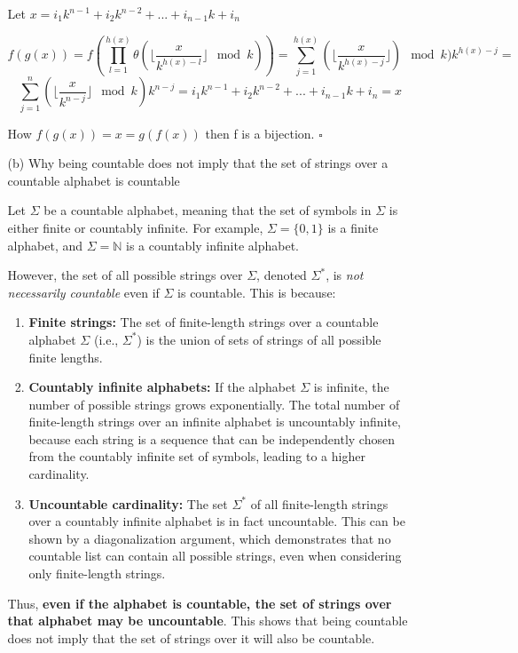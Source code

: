 \documentclass[9pt,tikz,border=2mm]{article}
\begin{document}
\begin{enumerate}
\begin{enumerate}
                Let $x = i_1k^{n-1} + i_2k^{n-2} + ... + i_{n-1}k + i_n$
          
                \[
                    f(g(x)) = f(\prod_{l=1}^{h(x)}\theta(\lfloor{\frac{x}{k^{h(x)-l}}}\rfloor \mod k)) = \sum_{j=1}^{h(x)}(\lfloor{\frac{x}{k^{h(x)-j}}}\rfloor) \mod k) k^{h(x)-j} =
                \]
                \[
                    \sum_{j=1}^{n}(\lfloor{\frac{x}{k^{n-j}}}\rfloor \mod k) k^{n-j}  = i_1k^{n-1} + i_2k^{n-2} + ... + i_{n-1}k + i_n = x
                \]

                How $f(g(x))=x=g(f(x))$ then f is a bijection.
                $\square$
              
                \item[(b)]Why being countable does not imply that the set of strings over a countable alphabet is countable

Let \( \Sigma \) be a countable alphabet, meaning that the set of symbols in \( \Sigma \) is either finite or countably infinite. For example, \( \Sigma = \{0, 1\} \) is a finite alphabet, and \( \Sigma = \mathbb{N} \) is a countably infinite alphabet.

However, the set of all possible strings over \( \Sigma \), denoted \( \Sigma^* \), is \textit{not necessarily countable} even if \( \Sigma \) is countable. This is because:

\begin{enumerate}
    \item \textbf{Finite strings:} The set of finite-length strings over a countable alphabet \( \Sigma \) (i.e., \( \Sigma^* \)) is the union of sets of strings of all possible finite lengths.
    \item \textbf{Countably infinite alphabets:} If the alphabet \( \Sigma \) is infinite, the number of possible strings grows exponentially. The total number of finite-length strings over an infinite alphabet is uncountably infinite, because each string is a sequence that can be independently chosen from the countably infinite set of symbols, leading to a higher cardinality.
    \item \textbf{Uncountable cardinality:} The set \( \Sigma^* \) of all finite-length strings over a countably infinite alphabet is in fact uncountable. This can be shown by a diagonalization argument, which demonstrates that no countable list can contain all possible strings, even when considering only finite-length strings.
\end{enumerate}

Thus, \textbf{even if the alphabet is countable, the set of strings over that alphabet may be uncountable}. This shows that being countable does not imply that the set of strings over it will also be countable.

            \end{enumerate}
    \end{enumerate}
\end{document}
